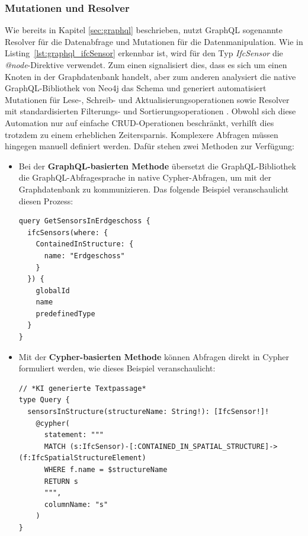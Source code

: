 \subsubsection{Mutationen und Resolver} \label{sec:Mutations_Resolvers}
Wie bereits in Kapitel \ref{sec:graphql} beschrieben, nutzt GraphQL sogenannte Resolver für die Datenabfrage und Mutationen für die Datenmanipulation. Wie in Listing~\ref{lst:graphql_ifcSensor} erkennbar ist, wird
für den Typ \textit{IfcSensor} die \textit{@node}-Direktive verwendet. Zum einen signalisiert dies, dass es sich um einen Knoten in der Graphdatenbank handelt, aber zum anderen analysiert
die native GraphQL-Bibliothek von Neo4j das Schema und generiert automatisiert Mutationen für Lese-, Schreib- und Aktualisierungsoperationen sowie Resolver mit standardisierten Filterungs- und Sortierungsoperationen \cite{neo4j_graphql_node}.
Obwohl sich diese Automation nur auf einfache CRUD-Operationen beschränkt, verhilft dies trotzdem zu einem erheblichen Zeitersparnis. Komplexere Abfragen müssen hingegen manuell definiert werden. Dafür stehen
zwei Methoden zur Verfügung:
\begin{itemize}
  \item Bei der \textbf{GraphQL-basierten Methode} übersetzt die GraphQL-Bibliothek die GraphQL-Abfragesprache in native Cypher-Abfragen, um mit der Graphdatenbank zu kommunizieren. Das folgende Beispiel veranschaulicht diesen Prozess:
        \begin{lstlisting}[caption={Clientseitige Abfrage für die Klasse \textit{IfcSensor}}, label={lst:graphql_clientQuery}]
query GetSensorsInErdgeschoss {
  ifcSensors(where: {
    ContainedInStructure: {
      name: "Erdgeschoss"
    }
  }) {
    globalId
    name
    predefinedType
  }
}
\end{lstlisting}
  \item Mit der \textbf{Cypher-basierten Methode} können Abfragen direkt in Cypher formuliert werden, wie dieses Beispiel veranschaulicht:
        \begin{lstlisting}[caption={Serverseitige Abfrage für die Klasse \textit{IfcSensor}}, label={lst:graphql_serverQuery}]
// *KI generierte Textpassage*
type Query {
  sensorsInStructure(structureName: String!): [IfcSensor!]!
    @cypher(
      statement: """
      MATCH (s:IfcSensor)-[:CONTAINED_IN_SPATIAL_STRUCTURE]->(f:IfcSpatialStructureElement)
      WHERE f.name = $structureName
      RETURN s
      """,
      columnName: "s"
    )
}
\end{lstlisting}
\end{itemize}
